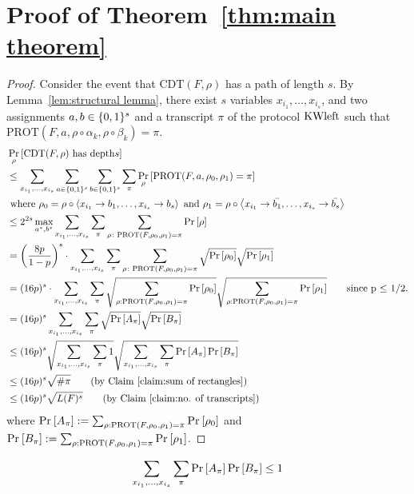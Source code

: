 \documentclass{article}
\newcommand{\cdt}{\mathrm{CDT}}
\newcommand{\prot}{\mathrm{PROT}}
\newcommand{\xvars}{x_{i_1}, \ldots , x_{i_s}}
\newcommand{\depth}{depth}
\begin{document}
\section{Proof of Theorem~\ref{thm:main theorem}}
\begin{proof}
    Consider the event that $\cdt(F,\rho)$ has a path of length $s$. By Lemma~\ref{lem:structural lemma}, there exist $s$ variables $\xvars$, and two assignments $a,b \in \{0,1\}^{s}$ and a transcript $\pi$ of the protocol $\text{KWleft}$ such that $\prot(F,a,\rho \circ \alpha_k, \rho \circ \beta_k) = \pi$. 
    \begin{align*}
        &\prob{\rho}{\cdt(F,\rho) \text{ has \depth } s}\\
            &\leq \sum_{\xvars} \sum_{a \in \cube{s}} \sum_{b \in \cube{s}} \sum_{\pi} \prob{\rho}{\prot(F,a,\rho_0,\rho_1) = \pi}\\
        & \text{ where }\rho_0 = \rho \circ \abra{x_{i_1} \to b_1, \ldots , x_{i_s} \to b_s} \text{ and }
        \rho_1 = \rho \circ \abra{x_{i_1} \to \bar{b_1}, \ldots , x_{i_s} \to \bar{b_s}}\\        
        &\leq 2^{2s} \max_{a^*,b^*}\sum_{\xvars} \sum_{\pi} \sum_{\rho\colon \prot(F,\rho_0,\rho_1) = \pi} \prob{}{\rho}\\
        &= \cbra{\frac{8p}{1-p}}^s \cdot \sum_{\xvars} \sum_{\pi} \sum_{\rho\colon \prot(F,\rho_0,\rho_1) = \pi} \sqrt{\prob{}{\rho_0}} \sqrt{\prob{}{\rho_1}}\\
        &= (16p)^s \cdot \sum_{\xvars} \sum_{\pi}  \sqrt{\sum_{\rho:\prot(F,\rho_0,\rho_1) = \pi} \prob{}{\rho_0}} \sqrt{\sum_{\rho:\prot(F,\rho_0,\rho_1) = \pi} \prob{}{\rho_1}} \tag*{since p $\leq$ 1/2.}\\
        &= (16p)^s \sum_{\xvars} \sum_{\pi} \sqrt{\prob{}{A_{\pi}}} \sqrt{\prob{}{B_{\pi}}}\\
        &\leq (16p)^s   \sqrt{\sum_{\xvars} \sum_{\pi} 1} \sqrt{\sum_{\xvars} \sum_{\pi} \prob{}{A_\pi}\prob{}{B_\pi}}\\
        &\leq (16p)^s\sqrt{\# \pi} \tag{by Claim~\ref{claim:sum of rectangles}}\\
        &\leq (16p)^s \sqrt{L(F)^s} \tag{by Claim~\ref{claim:no. of transcripts}}
    \end{align*}
    where $\prob{}{A_\pi} := \sum_{\rho:\prot(F,\rho_0,\rho_1) = \pi} \prob{}{\rho_0}$ and  $\prob{}{B_\pi} := \sum_{\rho:\prot(F,\rho_0,\rho_1) = \pi} \prob{}{\rho_1}$.
\end{proof}

    \begin{claim}
    \label{claim:sum of rectangles}
        $$\sum_{\xvars} \sum_{\pi} \prob{}{A_\pi}\prob{}{B_\pi} \leq 1$$
    \end{claim}
\newcommand{\corr}{Corr}
\newcommand{\f}{\maj}
\newcommand{\g}{C}
\end{document}
